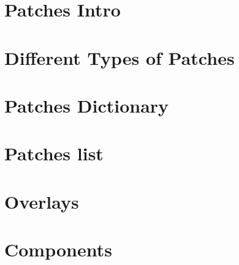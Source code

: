 \documentclass[11pt]{book}
\begin{document}
    \section{Patches Intro}

    \section{Different Types of Patches}

    \section{Patches Dictionary}

    \section{Patches list}

    \section{Overlays}

    \section{Components}
\end{document}
